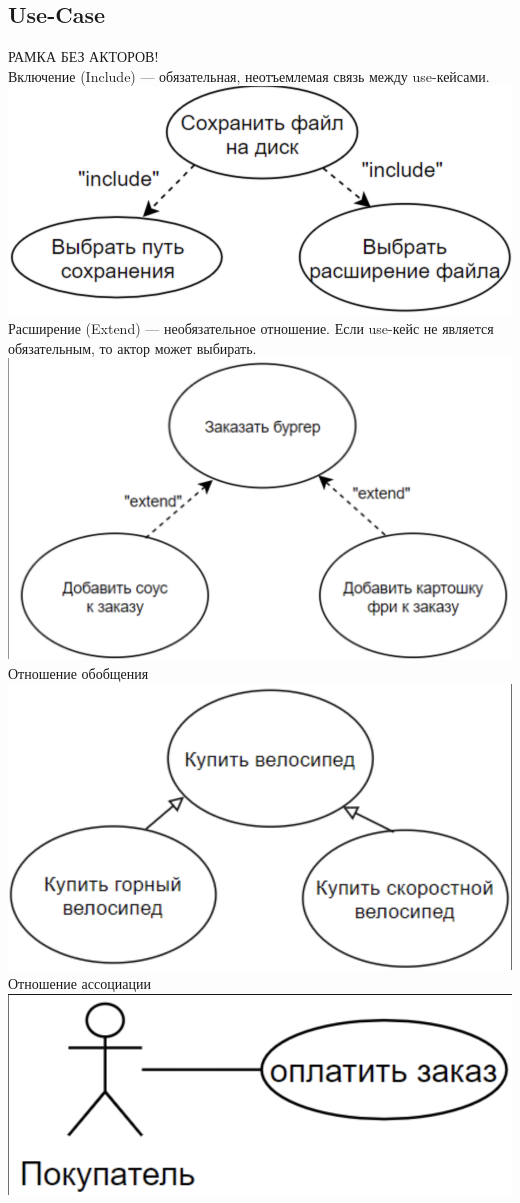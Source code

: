 \documentclass{article}
\begin{document}
\subsection{Use-Case}
РАМКА БЕЗ АКТОРОВ!\\
Включение (Include) — обязательная, неотъемлемая связь между use-кейсами.\\
\includegraphics[width=.3\textwidth]{include.png}\\
Расширение (Extend) — необязательное отношение. Если use-кейс не является обязательным, то актор может выбирать.
\\ \includegraphics[width=.3\textwidth]{extend.png}\\
Отношение обобщения\\
\includegraphics[width=.3\textwidth]{obob.png}\\
Отношение ассоциации\\
\includegraphics[width=.3\textwidth]{assos.png}
\end{document}
